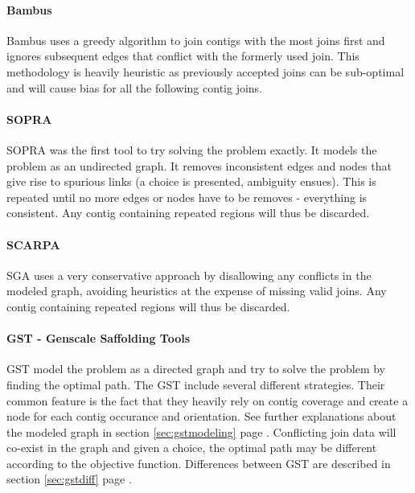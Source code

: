 \documentclass[12pt]{article}
\newcommand*{\fulleref}[1]{section \hyperref[{#1}] {\ref*{#1}} page {\pageref{#1}}}%
\begin{document}
\paragraph*{Bambus}
Bambus uses a greedy algorithm to join contigs with the most joins first and ignores subsequent edges that conflict with the formerly used join. This methodology is heavily heuristic as previously accepted joins can be sub-optimal and will cause bias for all the following contig joins.

\paragraph*{SOPRA} \cite{dayarian_sopra:_2010} SOPRA was the first tool to try solving the problem exactly. It models the problem as an undirected graph. It removes inconsistent edges and nodes that give rise to spurious links (a choice is presented, ambiguity ensues). This is repeated until no more edges or nodes have to be removes - everything is consistent. Any contig containing repeated regions will thus be discarded.

\paragraph*{SCARPA} \cite{donmez_scarpa:_2013} SGA uses a very conservative approach by disallowing any conflicts in the modeled graph, avoiding heuristics at the expense of missing valid joins. Any contig containing repeated regions will thus be discarded.

\paragraph*{GST - Genscale Saffolding Tools}
GST model the problem as a directed graph and try to solve the problem by finding the optimal path. The GST include several different strategies. Their common feature is the fact that they heavily rely on contig coverage and create a node for each contig occurance and orientation. See further explanations about the modeled graph in \fulleref{sec:gstmodeling}. Conflicting join data will co-exist in the graph and given a choice, the optimal path may be different according to the objective function. Differences between GST are described in \fulleref{sec:gstdiff}. 
\end{document}
